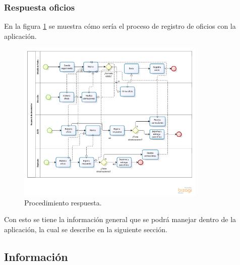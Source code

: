 \subsubsection{Respuesta oficios}

En la figura \ref{Respuesta oficio} se muestra cómo sería el proceso de registro de oficios con la aplicación.

\begin{figure}[htbp!]
	\centering 
		\includegraphics[width=0.8\textwidth]{images/propuesta/procesorespuesta}
	\caption{Procedimiento respuesta.}
	\label{Respuesta oficio}
\end{figure}

Con esto se tiene la información general que se podrá manejar dentro de la aplicación, la cual se describe en la siguiente sección.

\subsection{Información}


